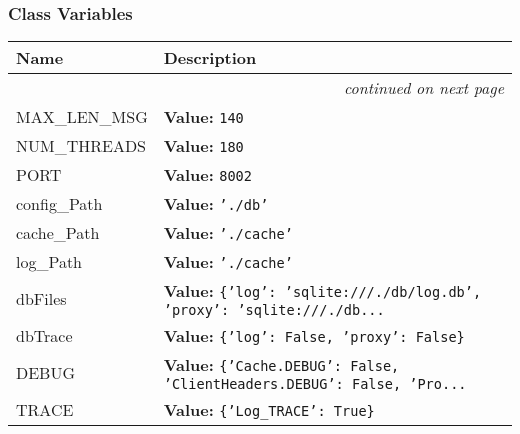 
  \subsubsection{Class Variables}

    \vspace{-1cm}
\hspace{\varindent}\begin{longtable}{|p{\varnamewidth}|p{\vardescrwidth}|l}
\cline{1-2}
\cline{1-2} \centering \textbf{Name} & \centering \textbf{Description}& \\
\cline{1-2}
\endhead\cline{1-2}\multicolumn{3}{r}{\small\textit{continued on next page}}\\\endfoot\cline{1-2}
\endlastfoot\raggedright M\-A\-X\-\_\-L\-E\-N\-\_\-M\-S\-G\- & \raggedright \textbf{Value:} 
{\tt 140}&\\
\cline{1-2}
\raggedright N\-U\-M\-\_\-T\-H\-R\-E\-A\-D\-S\- & \raggedright \textbf{Value:} 
{\tt 180}&\\
\cline{1-2}
\raggedright P\-O\-R\-T\- & \raggedright \textbf{Value:} 
{\tt 8002}&\\
\cline{1-2}
\raggedright c\-o\-n\-f\-i\-g\-\_\-P\-a\-t\-h\- & \raggedright \textbf{Value:} 
{\tt \texttt{'}\texttt{./db}\texttt{'}}&\\
\cline{1-2}
\raggedright c\-a\-c\-h\-e\-\_\-P\-a\-t\-h\- & \raggedright \textbf{Value:} 
{\tt \texttt{'}\texttt{./cache}\texttt{'}}&\\
\cline{1-2}
\raggedright l\-o\-g\-\_\-P\-a\-t\-h\- & \raggedright \textbf{Value:} 
{\tt \texttt{'}\texttt{./cache}\texttt{'}}&\\
\cline{1-2}
\raggedright d\-b\-F\-i\-l\-e\-s\- & \raggedright \textbf{Value:} 
{\tt \texttt{\{}\texttt{'}\texttt{log}\texttt{'}\texttt{: }\texttt{'}\texttt{sqlite:///./db/log.db}\texttt{'}\texttt{, }\texttt{'}\texttt{proxy}\texttt{'}\texttt{: }\texttt{'}\texttt{sqlite:///./db}\texttt{...}}&\\
\cline{1-2}
\raggedright d\-b\-T\-r\-a\-c\-e\- & \raggedright \textbf{Value:} 
{\tt \texttt{\{}\texttt{'}\texttt{log}\texttt{'}\texttt{: }False\texttt{, }\texttt{'}\texttt{proxy}\texttt{'}\texttt{: }False\texttt{\}}}&\\
\cline{1-2}
\raggedright D\-E\-B\-U\-G\- & \raggedright \textbf{Value:} 
{\tt \texttt{\{}\texttt{'}\texttt{Cache.DEBUG}\texttt{'}\texttt{: }False\texttt{, }\texttt{'}\texttt{ClientHeaders.DEBUG}\texttt{'}\texttt{: }False\texttt{, }\texttt{'}\texttt{Pro}\texttt{...}}&\\
\cline{1-2}
\raggedright T\-R\-A\-C\-E\- & \raggedright \textbf{Value:} 
{\tt \texttt{\{}\texttt{'}\texttt{Log\_TRACE}\texttt{'}\texttt{: }True\texttt{\}}}&\\
\cline{1-2}
\end{longtable}

